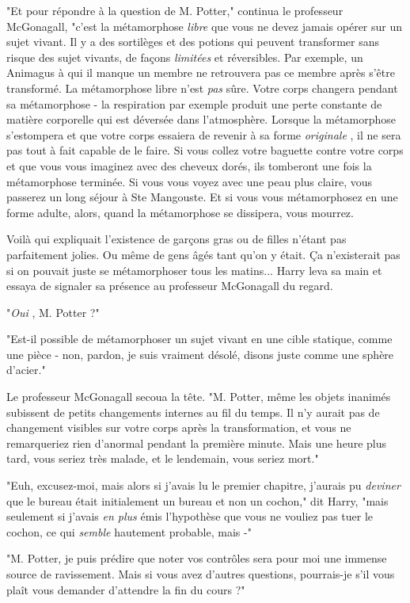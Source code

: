 "Et pour répondre à la question de M. Potter," continua le professeur McGonagall, "c'est la métamorphose \emph{libre}  que vous ne devez jamais opérer sur un sujet vivant. Il y a des sortilèges et des potions qui peuvent transformer sans risque des sujet vivants, de façons \emph{limitées}  et réversibles. Par exemple, un Animagus à qui il manque un membre ne retrouvera pas ce membre après s'être transformé. La métamorphose libre n'est \emph{pas}  sûre. Votre corps changera pendant sa métamorphose - la respiration par exemple produit une perte constante de matière corporelle qui est déversée dans l'atmosphère. Lorsque la métamorphose s'estompera et que votre corps essaiera de revenir à sa forme \emph{originale} , il ne sera pas tout à fait capable de le faire. Si vous collez votre baguette contre votre corps et que vous vous imaginez avec des cheveux dorés, ils tomberont une fois la métamorphose terminée. Si vous vous voyez avec une peau plus claire, vous passerez un long séjour à Ste Mangouste. Et si vous vous métamorphosez en une forme adulte, alors, quand la métamorphose se dissipera, vous mourrez.

Voilà qui expliquait l'existence de garçons gras ou de filles n'étant pas parfaitement jolies. Ou même de gens âgés tant qu'on y était. Ça n'existerait pas si on pouvait juste se métamorphoser tous les matins... Harry leva sa main et essaya de signaler sa présence au professeur McGonagall du regard.

"\emph{Oui} , M. Potter ?"

"Est-il possible de métamorphoser un sujet vivant en une cible statique, comme une pièce - non, pardon, je suis vraiment désolé, disons juste comme une sphère d'acier."

Le professeur McGonagall secoua la tête. "M. Potter, même les objets inanimés subissent de petits changements internes au fil du temps. Il n'y aurait pas de changement visibles sur votre corps après la transformation, et vous ne remarqueriez rien d'anormal pendant la première minute. Mais une heure plus tard, vous seriez très malade, et le lendemain, vous seriez mort."

"Euh, excusez-moi, mais alors si j'avais lu le premier chapitre, j'aurais pu \emph{deviner}  que le bureau était initialement un bureau et non un cochon," dit Harry, "mais seulement si j'avais \emph{en plus}  émis l'hypothèse que vous ne vouliez pas tuer le cochon, ce qui \emph{semble}  hautement probable, mais -"

"M. Potter, je puis prédire que noter vos contrôles sera pour moi une immense source de ravissement. Mais si vous avez d'autres questions, pourrais-je s'il vous plaît vous demander d'attendre la fin du cours ?"

